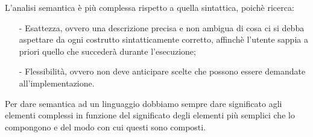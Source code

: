 \documentclass[a4paper, 10pt]{report}
\begin{document}
L'analisi semantica è più complessa rispetto a quella sintattica, poichè ricerca:

\begin{itemize}
\item[-] Esattezza, ovvero una descrizione precisa e non ambigua di cosa ci si  debba  aspettare  da  ogni  costrutto  sintatticamente corretto,   affinchè l'utente sappia  a   priori   quello   che   succederà durante l’esecuzione;
\item[-] Flessibilità, ovvero non deve anticipare  scelte  che  possono essere demandate all’implementazione.
\end{itemize}

\noindent Per  dare  semantica ad un linguaggio dobbiamo  sempre  dare significato   agli   elementi   complessi   in   funzione   del significato degli elementi più semplici che lo compongono e del modo con cui questi sono composti. 
\end{document}
